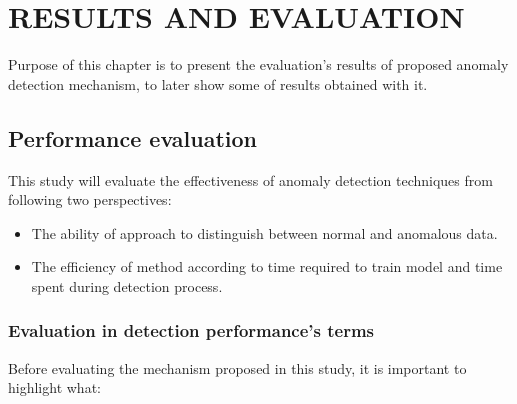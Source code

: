 \chapter{\uppercase{RESULTS AND EVALUATION}}
\label{Capitulo 6}

Purpose of this chapter is to present the evaluation's results of proposed  anomaly detection mechanism, to later show some of results obtained with it.

\section{Performance evaluation}

This study will evaluate the effectiveness of anomaly detection techniques from following two perspectives:
\begin{itemize}
\item The ability of approach to distinguish between normal and anomalous data.
\item The efficiency of method according to time required to train model and time spent during detection process.
\end{itemize}

\subsection{Evaluation in detection performance's terms}

Before evaluating the mechanism proposed in this study, it is important to highlight what:

